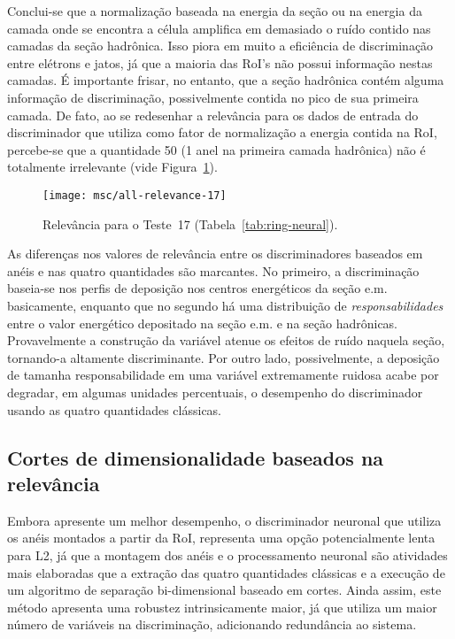 Conclui-se que a normalização baseada na energia da seção ou na energia da
camada onde se encontra a célula amplifica em demasiado o ruído contido nas
camadas da seção hadrônica. Isso piora em muito a eficiência de discriminação
entre elétrons e jatos, já que a maioria das RoI's não possui informação nestas
camadas. É importante frisar, no entanto, que a seção hadrônica contém alguma
informação de discriminação, possivelmente contida no pico de sua primeira
camada. De fato, ao se redesenhar a relevância para os dados de entrada do
discriminador que utiliza como fator de normalização a energia contida na RoI,
percebe-se que a quantidade 50 (1 anel na primeira camada hadrônica) não é
totalmente irrelevante (vide Figura~\ref{fig:relev-all}).

\begin{figure}
\begin{center}
\texttt{[image: msc/all-relevance-17]}
\end{center}
\caption{Relevância para o Teste~17 (Tabela~\ref{tab:ring-neural}).}
\label{fig:relev-all}
\end{figure}

As diferenças nos valores de relevância entre os discriminadores baseados em
anéis e nas quatro quantidades são marcantes. No primeiro, a discriminação
baseia-se nos perfis de deposição nos centros energéticos da seção
e.m. basicamente, enquanto que no segundo há uma distribuição de
\emph{responsabilidades} entre o valor energético depositado na seção e.m. e na
seção hadrônicas. Provavelmente a construção da variável \ethad atenue os
efeitos de ruído naquela seção, tornando-a altamente discriminante. Por outro
lado, possivelmente, a deposição de tamanha responsabilidade em uma variável
extremamente ruidosa acabe por degradar, em algumas unidades percentuais, o
desempenho do discriminador usando as quatro quantidades clássicas.

\subsection{Cortes de dimensionalidade baseados na rele\-vân\-cia}

Embora apresente um melhor desempenho, o discriminador neuronal que utiliza os
anéis montados a partir da RoI, representa uma opção potencialmente lenta para
L2, já que a montagem dos anéis e o processamento neuronal são atividades mais
elaboradas que a extração das quatro quantidades clássicas e a execução de um
algoritmo de separação bi-dimensional baseado em cortes. Ainda assim, este
método apresenta uma robustez intrinsicamente maior, já que utiliza um maior
número de variáveis na discriminação, adicionando redundância ao sistema.

